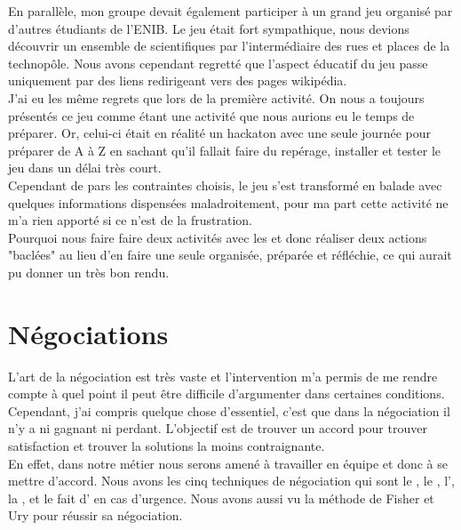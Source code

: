 En parallèle, mon groupe devait également participer à un grand jeu organisé par d'autres étudiants de l'ENIB. Le jeu était fort sympathique, nous devions découvrir un ensemble de scientifiques par l'intermédiaire des rues et places de la technopôle. Nous avons cependant regretté que l'aspect éducatif du jeu passe uniquement par des liens redirigeant vers des pages wikipédia.\\

J'ai eu les même regrets que lors de la première activité. On nous a toujours présentés ce jeu comme étant une activité que nous aurions eu le temps de préparer. Or, celui-ci était en réalité un hackaton avec une seule journée pour préparer de A à Z en sachant qu'il fallait faire du repérage, installer et tester le jeu dans un délai très court.\\
Cependant de pars les contraintes choisis, le jeu s'est transformé en balade avec quelques informations dispensées maladroitement, pour ma part cette activité ne m'a rien apporté si ce n'est de la frustration.\\

Pourquoi nous faire faire deux activités avec les \pd et donc réaliser deux actions "baclées" au lieu d'en faire une seule organisée, préparée et réfléchie, ce qui aurait pu donner un très bon rendu.\\





\section{Négociations}

L'art de la négociation est très vaste et l'intervention m'a permis de me rendre compte à quel point il peut être difficile d'argumenter dans certaines conditions.\\
Cependant, j'ai compris quelque chose d'essentiel, c'est que dans la négociation il n'y a ni gagnant ni perdant. L'objectif est de trouver un accord pour trouver satisfaction et trouver la solutions la moins contraignante.\\

En effet, dans notre métier nous serons amené à travailler en équipe et donc à se mettre d'accord.
Nous avons les cinq techniques de négociation qui sont le , le , l', la , et le fait d' en cas d'urgence. Nous avons aussi vu la méthode de Fisher et Ury pour réussir sa négociation.\\

